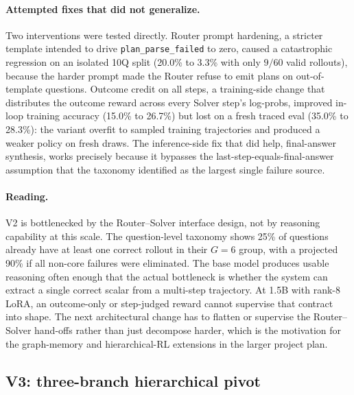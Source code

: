 \documentclass[11pt]{article}
\begin{document}
\paragraph{Attempted fixes that did not generalize.} Two interventions were tested directly. Router prompt hardening, a stricter template intended to drive \texttt{plan\_parse\_failed} to zero, caused a catastrophic regression on an isolated 10Q split (20.0\% to 3.3\% with only $9/60$ valid rollouts), because the harder prompt made the Router refuse to emit plans on out-of-template questions. Outcome credit on all steps, a training-side change that distributes the outcome reward across every Solver step's log-probs, improved in-loop training accuracy (15.0\% to 26.7\%) but lost on a fresh traced eval (35.0\% to 28.3\%): the variant overfit to sampled training trajectories and produced a weaker policy on fresh draws. The inference-side fix that did help, final-answer synthesis, works precisely because it bypasses the last-step-equals-final-answer assumption that the taxonomy identified as the largest single failure source.

\paragraph{Reading.} V2 is bottlenecked by the Router--Solver interface design, not by reasoning capability at this scale. The question-level taxonomy shows 25\% of questions already have at least one correct rollout in their $G{=}6$ group, with a projected 90\% if all non-core failures were eliminated. The base model produces usable reasoning often enough that the actual bottleneck is whether the system can extract a single correct scalar from a multi-step trajectory. At 1.5B with rank-8 LoRA, an outcome-only or step-judged reward cannot supervise that contract into shape. The next architectural change has to flatten or supervise the Router--Solver hand-offs rather than just decompose harder, which is the motivation for the graph-memory and hierarchical-RL extensions in the larger project plan.

\subsection{V3: three-branch hierarchical pivot}
\label{sec:rsv3}
\end{document}

